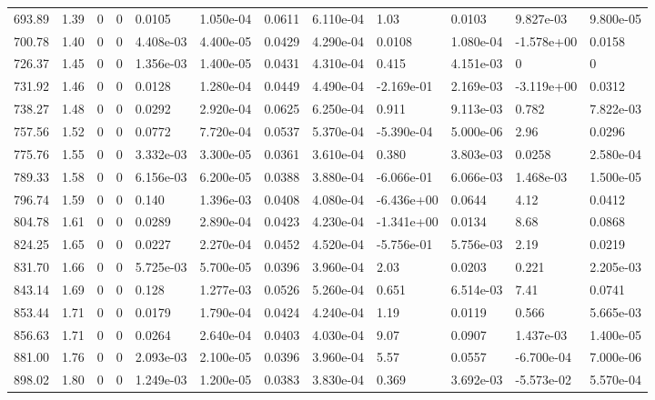 \documentclass[preview]{standalone}
\begin{document}
{{{\begin{tabular}{L{1.2cm}C{1.2cm} C{0.3cm}C{0.5cm} C{1.4cm}C{1.4cm} C{1.4cm}C{1.4cm} C{1.6cm}C{1.6cm} C{1.6cm}C{1.6cm}}
  693.89  &  1.39  & 0     &  0 &  0.0105  & 1.050e-04  &  0.0611&   6.110e-04& 1.03 & 0.0103   &  9.827e-03 & 9.800e-05  \\ 
  700.78  &  1.40  & 0     &  0 &  4.408e-03  & 4.400e-05  &  0.0429&   4.290e-04& 0.0108 & 1.080e-04   &  -1.578e+00 & 0.0158  \\ 
  726.37  &  1.45  & 0     &  0 &  1.356e-03  & 1.400e-05  &  0.0431&   4.310e-04& 0.415 & 4.151e-03   &  0 & 0  \\ 
  731.92  &  1.46  & 0     &  0 &  0.0128  & 1.280e-04  &  0.0449&   4.490e-04& -2.169e-01 & 2.169e-03   &  -3.119e+00 & 0.0312  \\ 
  738.27  &  1.48  & 0     &  0 &  0.0292  & 2.920e-04  &  0.0625&   6.250e-04& 0.911 & 9.113e-03   &  0.782 & 7.822e-03  \\ 
  757.56  &  1.52  & 0     &  0 &  0.0772  & 7.720e-04  &  0.0537&   5.370e-04& -5.390e-04 & 5.000e-06   &  2.96 & 0.0296  \\ 
  775.76  &  1.55  & 0     &  0 &  3.332e-03  & 3.300e-05  &  0.0361&   3.610e-04& 0.380 & 3.803e-03   &  0.0258 & 2.580e-04  \\ 
  789.33  &  1.58  & 0     &  0 &  6.156e-03  & 6.200e-05  &  0.0388&   3.880e-04& -6.066e-01 & 6.066e-03   &  1.468e-03 & 1.500e-05  \\ 
  796.74  &  1.59  & 0     &  0 &  0.140  & 1.396e-03  &  0.0408&   4.080e-04& -6.436e+00 & 0.0644   &  4.12 & 0.0412  \\ 
  804.78  &  1.61  & 0     &  0 &  0.0289  & 2.890e-04  &  0.0423&   4.230e-04& -1.341e+00 & 0.0134   &  8.68 & 0.0868  \\ 
  824.25  &  1.65  & 0     &  0 &  0.0227  & 2.270e-04  &  0.0452&   4.520e-04& -5.756e-01 & 5.756e-03   &  2.19 & 0.0219  \\ 
  831.70  &  1.66  & 0     &  0 &  5.725e-03  & 5.700e-05  &  0.0396&   3.960e-04& 2.03 & 0.0203   &  0.221 & 2.205e-03  \\ 
  843.14  &  1.69  & 0     &  0 &  0.128  & 1.277e-03  &  0.0526&   5.260e-04& 0.651 & 6.514e-03   &  7.41 & 0.0741  \\ 
  853.44  &  1.71  & 0     &  0 &  0.0179  & 1.790e-04  &  0.0424&   4.240e-04& 1.19 & 0.0119   &  0.566 & 5.665e-03  \\ 
  856.63  &  1.71  & 0     &  0 &  0.0264  & 2.640e-04  &  0.0403&   4.030e-04& 9.07 & 0.0907   &  1.437e-03 & 1.400e-05  \\ 
  881.00  &  1.76  & 0     &  0 &  2.093e-03  & 2.100e-05  &  0.0396&   3.960e-04& 5.57 & 0.0557   &  -6.700e-04 & 7.000e-06  \\ 
  898.02  &  1.80  & 0     &  0 &  1.249e-03  & 1.200e-05  &  0.0383&   3.830e-04& 0.369 & 3.692e-03   &  -5.573e-02 & 5.570e-04  \\ 
\hline 
\end{tabular} 

}}}
\end{document}
